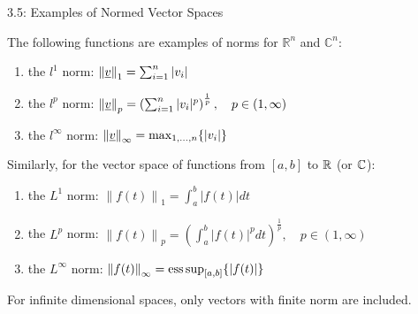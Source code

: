 \documentclass[10pt,letterpaper,english]{beamer}
\begin{document}
\begin{frame}{3.5: Examples of Normed Vector Spaces}

\begin{example}
The following functions are examples of norms for $\mathbb{R}^n$ and $\mathbb{C}^n$:
\begin{enumerate}
\item the $l^1$ norm: $\left\| \underline{v} \right\|_1 = \sum_{i=1}^n |v_i|$
\item the $l^p$ norm: $\left\| \underline{v} \right\|_p = \left( \sum_{i=1}^n |v_i|^p \right)^{\frac{1}{p}}, \quad p \in (1,\infty)$
\item the $l^{\infty}$ norm: $\left\| \underline{v} \right\|_{\infty} = \max_{1,\ldots, n} \{ |v_i| \}$
\end{enumerate}
\end{example}

\begin{example}
Similarly, for the vector space of functions from $[a, b]$ to $\mathbb{R}$ (or $\mathbb{C}$):
\begin{enumerate}
\item the $L^1$ norm: $\left\| f(t) \right\|_1 = \int_a^b |f(t)| dt$
\item the $L^p$ norm: $\left\| f(t) \right\|_p = \left( \int_a^b |f(t)|^p dt \right)^{\frac{1}{p}}, \quad p \in (1,\infty)$
\item the $L^{\infty}$ norm: $\left\| f(t) \right\|_{\infty} = \operatorname*{ess\,sup}_{[a,b]} \{ | f(t) | \}$
\end{enumerate}
\end{example}

For infinite dimensional spaces, only vectors with finite norm are included.

\end{frame}
\end{document}
